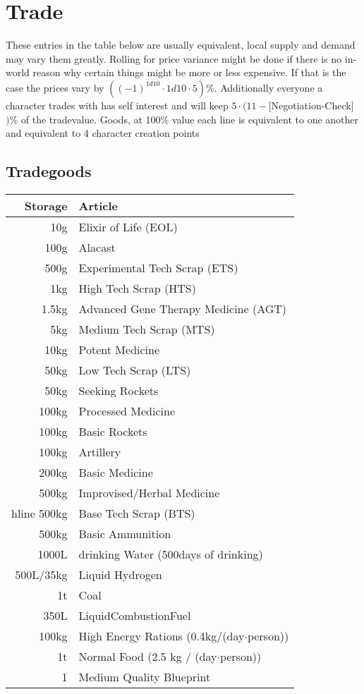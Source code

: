 \section{Trade}\label{subsec:trade}
These entries in the table below are usually equivalent, local supply and demand may vary them greatly.
Rolling for price variance might be done if there is no in-world reason why certain things might be more or
less expensive.
If that is the case the prices vary by \(((-1)^{1d10}\cdot1d10\cdot5) \%\).
Additionally everyone a character trades with has self interest and will keep \(5\cdot(11-\)[Negotiation-Check]\()\%\) of
the tradevalue.\vspace{1.5cm}
Goods, at 100\% value each line is equivalent to one another and equivalent to 4 character creation points \par
\subsection{Tradegoods}
\begin{tabular}{|r|l|}
    \hline
    Storage & Article\\\hline
    10g & Elixir of Life (EOL)\\\hline
    100g & Alacast\\\hline
    500g & Experimental Tech Scrap (ETS)\\\hline
    1kg & High Tech Scrap (HTS)\\\hline
    1.5kg & Advanced Gene Therapy Medicine (AGT)\\\hline
    5kg & Medium Tech Scrap (MTS)\\\hline
    10kg & Potent Medicine\\\hline
    50kg & Low Tech Scrap (LTS)\\\hline
    50kg & Seeking Rockets\\\hline
    100kg & Processed Medicine\\\hline
    100kg & Basic Rockets\\\hline
    100kg & Artillery\\\hline
    200kg & Basic Medicine\\\hline
    500kg & Improvised/Herbal Medicine\\hline
    500kg & Base Tech Scrap (BTS)\\\hline
    500kg & Basic Ammunition\\\hline
    1000L & drinking Water (500days of drinking)\\\hline
    500L/35kg & Liquid Hydrogen\\\hline
    1t & Coal\\\hline
    350L & LiquidCombustionFuel\\\hline
    100kg & High Energy Rations (0.4kg/(day\(\cdot\)person))\\\hline
    1t & Normal Food (2.5 kg / (day\(\cdot\)person))\\\hline
    1 & Medium Quality Blueprint\\\hline
\end{tabular}\par
